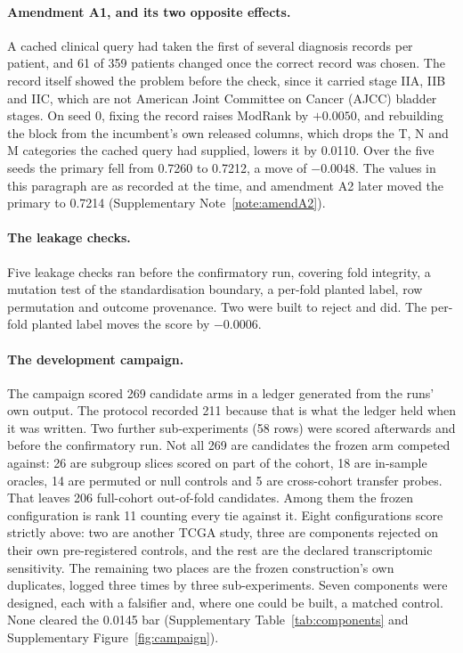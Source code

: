 \documentclass[11pt]{article}
\begin{document}
\paragraph{Amendment A1, and its two opposite effects.} A cached clinical query had taken the first
of several diagnosis records per patient, and 61 of 359 patients changed once the correct record was
chosen. The record itself showed the problem before the check, since it carried stage IIA, IIB and IIC,
which are not American Joint Committee on Cancer (AJCC) bladder stages. On seed 0, fixing the record
raises ModRank by $+0.0050$, and rebuilding the block from the incumbent's own released columns, which
drops the T, N and M categories the cached query had supplied, lowers it by 0.0110. Over the five
seeds the primary fell from 0.7260 to 0.7212, a move of $-0.0048$. The values in this paragraph are
as recorded at the time, and amendment A2 later moved the primary to 0.7214 (Supplementary
Note~\ref{note:amendA2}).

\paragraph{The leakage checks.} Five leakage checks ran before the confirmatory run, covering fold integrity,
a mutation test of the standardisation boundary, a per-fold planted label, row permutation and
outcome provenance. Two were built to reject and did. The per-fold planted label moves the score by
$-0.0006$.

\paragraph{The development campaign.} The campaign scored 269 candidate arms in a ledger generated
from the runs' own output. The protocol recorded 211 because that is what the ledger held when it was
written. Two further sub-experiments (58 rows) were scored afterwards and before the confirmatory
run. Not all 269 are candidates the frozen arm competed against: 26 are subgroup slices scored on part
of the cohort, 18 are in-sample oracles, 14 are permuted or null controls and 5 are cross-cohort
transfer probes. That leaves 206 full-cohort out-of-fold candidates. Among them the frozen
configuration is rank 11 counting every tie against it. Eight configurations score strictly above:
two are another TCGA study, three are components rejected on their own pre-registered controls, and
the rest are the declared transcriptomic sensitivity. The remaining two places are the frozen
construction's own duplicates, logged three times by three sub-experiments. Seven components were
designed, each with a falsifier and, where one could be built, a matched control. None cleared the
0.0145 bar (Supplementary Table~\ref{tab:components} and Supplementary Figure~\ref{fig:campaign}).
\end{document}
